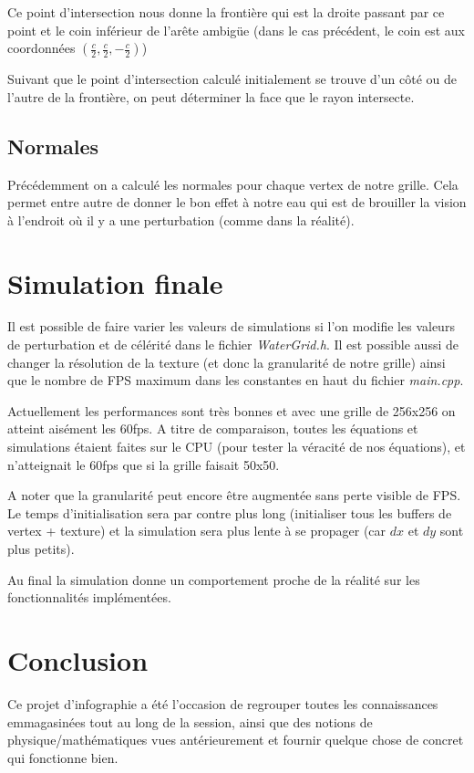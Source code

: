\documentclass[a4paper,11pt,leqno]{article}
\begin{document}
Ce point d'intersection nous donne la frontière qui est la droite passant par ce point et le coin inférieur de l'arête ambigüe (dans le cas précédent, le coin est aux coordonnées $(\frac{c}{2}, \frac{c}{2}, -\frac{c}{2})$)

Suivant que le point d'intersection calculé initialement se trouve d'un côté ou de l'autre de la frontière, on peut déterminer la face que le rayon intersecte.

\subsection{Normales}

Précédemment on a calculé les normales pour chaque vertex de notre grille. Cela permet entre autre de donner le bon effet à notre eau qui est de brouiller la vision à l'endroit où il y a une perturbation (comme dans la réalité).

\section{Simulation finale}

Il est possible de faire varier les valeurs de simulations si l'on modifie les valeurs de perturbation et de célérité dans le fichier \emph{WaterGrid.h}. Il est possible aussi de changer la résolution de la texture (et donc la granularité de notre grille) ainsi que le nombre de FPS maximum dans les constantes en haut du fichier \emph{main.cpp}.

Actuellement les performances sont très bonnes et avec une grille de 256x256 on atteint aisément les 60fps. 
A titre de comparaison, toutes les équations et simulations étaient faites sur le CPU (pour tester la véracité de nos équations), et n'atteignait le 60fps que si la grille faisait 50x50.

A noter que la granularité peut encore être augmentée sans perte visible de FPS. Le temps d'initialisation sera par contre plus long (initialiser tous les buffers de vertex + texture) et la simulation sera plus lente à se propager (car $dx$ et $dy$ sont plus petits).

Au final la simulation donne un comportement proche de la réalité sur les fonctionnalités implémentées.

\section{Conclusion}

Ce projet d'infographie a été l'occasion de regrouper toutes les connaissances emmagasinées tout au long de la session, ainsi que des notions de physique/mathématiques vues antérieurement et fournir quelque chose de concret qui fonctionne bien. 
\end{document}
